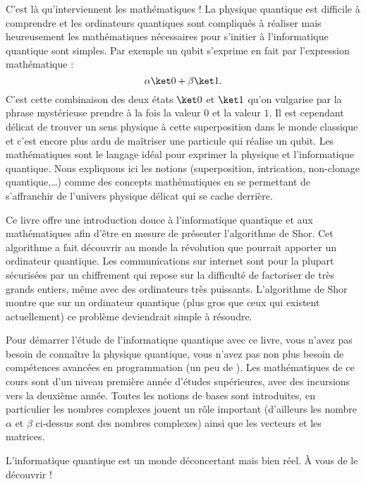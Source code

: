 \smallskip

C'est là qu'interviennent les mathématiques ! La physique quantique est difficile à comprendre et les ordinateurs quantiques sont compliqués à réaliser mais heureusement les mathématiques nécessaires pour s'initier à l'informatique quantique sont simples.
Par exemple un qubit s'exprime en fait par l'expression mathématique :
$$\alpha\ket0 + \beta\ket1.$$
C'est cette combinaison des deux états $\ket0$ et $\ket1$ qu'on vulgarise par la phrase mystérieuse \og{}prendre à la fois la valeur $0$ et la valeur $1$\fg{}. Il est cependant délicat de trouver un sens physique à cette superposition dans le monde classique et c'est encore plus ardu de maîtriser une particule qui réalise un qubit.  
Les mathématiques sont le langage idéal pour exprimer la physique et l'informatique quantique. Nous expliquons ici les notions (superposition, intrication, non-clonage quantique,\ldots{}) comme des concepts mathématiques en se permettant de s'affranchir de l'univers physique délicat qui se cache derrière.

\smallskip

Ce livre offre une introduction douce à l'informatique quantique et aux mathématiques afin d'être en mesure de présenter l'algorithme de Shor. Cet algorithme a fait découvrir au monde la révolution que pourrait apporter un ordinateur quantique. Les communications sur internet sont pour la plupart sécurisées par un chiffrement qui repose sur la difficulté de factoriser de très grands entiers, même avec des ordinateurs très puissants. L'algorithme de Shor montre que sur un ordinateur quantique (plus gros que ceux qui existent actuellement) ce problème deviendrait simple à résoudre.

\smallskip

Pour démarrer l'étude de l'informatique quantique avec ce livre, vous n'avez pas besoin de connaître la physique quantique, vous n'avez pas non plus besoin de compétences avancées en programmation (un peu de \Python).
Les mathématiques de ce cours sont d'un niveau première année d'études supérieures, avec des incursions vers la deuxième année. Toutes les notions de bases sont introduites, en particulier les nombres complexes jouent un rôle important (d'ailleurs les nombre $\alpha$ et $\beta$ ci-dessus sont des nombres complexes) ainsi que les vecteurs et les matrices.

L'informatique quantique est un monde déconcertant mais bien réel. À vous de le découvrir !


